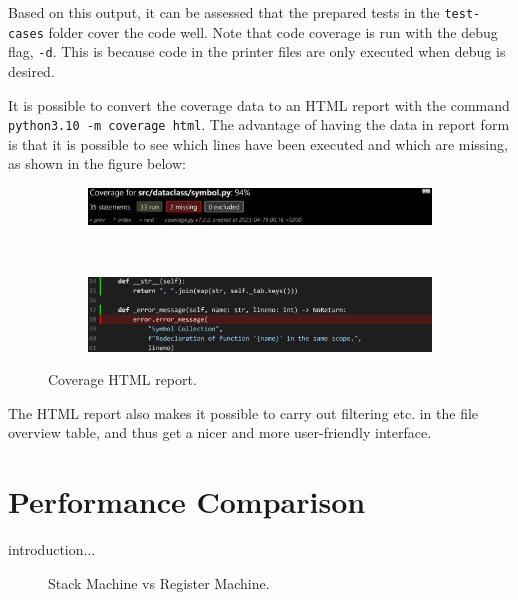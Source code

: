 Based on this output, it can be assessed that the prepared tests in the \texttt{test-cases} folder cover the code well. Note that code coverage is run with the debug flag, \texttt{-d}. This is because code in the printer files are only executed when debug is desired.

It is possible to convert the coverage data to an HTML report with the command \texttt{python3.10 -m coverage html}. The advantage of having the data in report form is that it is possible to see which lines have been executed and which are missing, as shown in the figure below: 

\begin{figure}[H]
    \centering
    \begin{subfigure}{1\textwidth}
        \centering
        \includegraphics[width=1\textwidth]{misc/images/Coverage_Panel.png}
        \end{subfigure}\\
        \begin{subfigure}{1\textwidth}
        \centering
        \includegraphics[width=1\textwidth]{misc/images/Coverage_Info.png}
        \end{subfigure}
    \caption{Coverage HTML report.}
\end{figure}

The HTML report also makes it possible to carry out filtering etc. in the file overview table, and thus get a nicer and more user-friendly interface.

\chapter{Performance Comparison}
introduction...

\begin{figure}[H]
    \centering
    
    \caption{Stack Machine vs Register Machine.}
    \label{fig:performance_comparison}
\end{figure}

